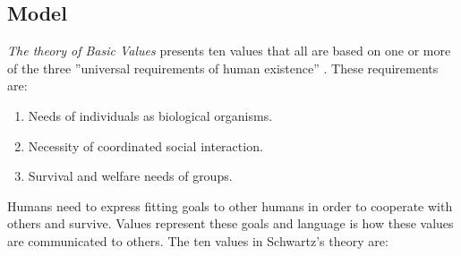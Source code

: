 \subsection{Model}
\textit{The theory of Basic Values} presents ten values that all are based on one or more of the three ''universal requirements of human existence'' \citep{schwartz2012overview}. These requirements are:

\begin{enumerate}
    \item Needs of individuals as biological organisms.
    \item Necessity of coordinated social interaction.
    \item Survival and welfare needs of groups.
\end{enumerate}

Humans need to express fitting goals to other humans in order to cooperate with others and survive. Values represent these goals and language is how these values are communicated to others. The ten values in Schwartz’s theory are:

